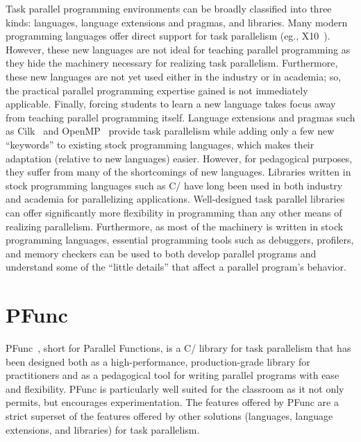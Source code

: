 \documentclass[9pt,twocolumn,letter]{article}
\begin{document}
Task parallel programming environments can be broadly classified into three
kinds: languages, language extensions and pragmas, and libraries.
Many modern programming languages offer direct support for task parallelism
(eg., X10~\cite{Charles:2005p1232}).
%
However, these new languages are not ideal for teaching parallel programming as
they hide the machinery necessary for realizing task parallelism.
%
Furthermore, these new languages are not yet used either in the industry or in
academia; so, the practical parallel programming expertise gained is not
immediately applicable.
%
Finally, forcing students to learn a new language takes focus away from
teaching parallel programming itself.
Language extensions and pragmas such as Cilk~\cite{FrigoLeRa98} and
OpenMP~\cite{kn:omp_30} provide task parallelism while adding only a few new
``keywords'' to existing stock programming languages, which makes their
adaptation (relative to new languages) easier.
%
However, for pedagogical purposes, they suffer from many of the shortcomings of
new languages.
Libraries written in stock programming languages such as C/\Cpp{} have long 
been used in both industry and academia for parallelizing applications.
%
Well-designed task parallel libraries can offer significantly more
flexibility in programming than any other means of realizing
parallelism.
%
Furthermore, as most of the machinery is written in stock programming
languages, essential programming tools such as debuggers, profilers, and memory
checkers can be used to both develop parallel programs and understand some of
the ``little details'' that affect a parallel program's behavior.

%
%
%
\section{PFunc}
\label{sec:pfunc}
PFunc~\cite{kambadur09:pfunc}, short for Parallel Functions, is a C/\Cpp{}
library for task parallelism that has been designed both as a
high-performance, production-grade library for practitioners and as a
pedagogical tool for writing parallel programs with ease and flexibility.
%
PFunc is particularly well suited for the classroom as it not only permits, but
encourages experimentation.
%
The features offered by PFunc are a strict superset of the features offered by
other solutions (languages, language extensions, and libraries) for task
parallelism.
\end{document}
